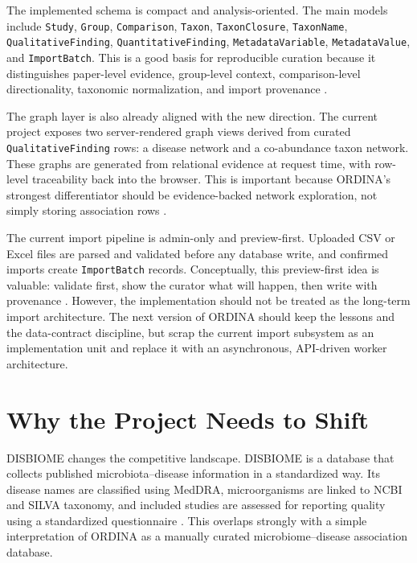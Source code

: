 \documentclass[11pt,a4paper]{article}
\begin{document}
The implemented schema is compact and analysis-oriented. The main models include \texttt{Study}, \texttt{Group}, \texttt{Comparison}, \texttt{Taxon}, \texttt{TaxonClosure}, \texttt{TaxonName}, \texttt{QualitativeFinding}, \texttt{QuantitativeFinding}, \texttt{MetadataVariable}, \texttt{MetadataValue}, and \texttt{ImportBatch}. This is a good basis for reproducible curation because it distinguishes paper-level evidence, group-level context, comparison-level directionality, taxonomic normalization, and import provenance \cite{ordina-schema}.

The graph layer is also already aligned with the new direction. The current project exposes two server-rendered graph views derived from curated \texttt{QualitativeFinding} rows: a disease network and a co-abundance taxon network. These graphs are generated from relational evidence at request time, with row-level traceability back into the browser. This is important because ORDINA's strongest differentiator should be evidence-backed network exploration, not simply storing association rows \cite{ordina-graph}.

The current import pipeline is admin-only and preview-first. Uploaded CSV or Excel files are parsed and validated before any database write, and confirmed imports create \texttt{ImportBatch} records. Conceptually, this preview-first idea is valuable: validate first, show the curator what will happen, then write with provenance \cite{ordina-import}. However, the implementation should not be treated as the long-term import architecture. The next version of ORDINA should keep the lessons and the data-contract discipline, but scrap the current import subsystem as an implementation unit and replace it with an asynchronous, API-driven worker architecture.

\section{Why the Project Needs to Shift}

DISBIOME changes the competitive landscape. DISBIOME is a database that collects published microbiota--disease information in a standardized way. Its disease names are classified using MedDRA, microorganisms are linked to NCBI and SILVA taxonomy, and included studies are assessed for reporting quality using a standardized questionnaire \cite{disbiome-paper}. This overlaps strongly with a simple interpretation of ORDINA as a manually curated microbiome--disease association database.
\end{document}
